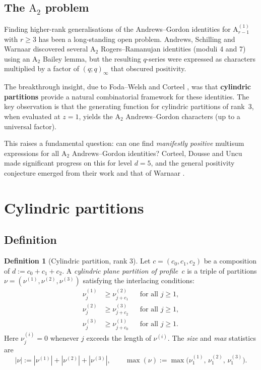 \documentclass[11pt]{article}
\theoremstyle{plain}
\theoremstyle{definition}
\newtheorem{definition}[theorem]{Definition}
\begin{document}
\subsection{The $\mathrm{A}_2$ problem}

Finding higher-rank generalisations of the Andrews--Gordon identities
for $\mathrm{A}_{r-1}^{(1)}$ with $r \geq 3$ has been a long-standing open problem.
Andrews, Schilling and Warnaar \cite{ASW} discovered several
$\mathrm{A}_2$ Rogers--Ramanujan identities (moduli 4 and 7) using an
$\mathrm{A}_2$ Bailey lemma, but the resulting $q$-series were expressed as
characters multiplied by a factor of $(q;q)_\infty$ that obscured positivity.

The breakthrough insight, due to Foda--Welsh \cite{FW} and
Corteel \cite{Corteel}, was that \textbf{cylindric partitions} provide
a natural combinatorial framework for these identities.  The key
observation is that the generating function for cylindric partitions of
rank~3, when evaluated at $z = 1$, yields the $\mathrm{A}_2$
Andrews--Gordon characters (up to a universal factor).

This raises a fundamental question: can one find \emph{manifestly positive}
multisum expressions for all $\mathrm{A}_2$ Andrews--Gordon identities?
Corteel, Dousse and Uncu \cite{CDU} made significant progress on this
for level $d = 5$, and the general positivity conjecture emerged from
their work and that of Warnaar \cite{W}.


\section{Cylindric partitions}
\label{sec:cpp}

\subsection{Definition}

\begin{definition}[Cylindric partition, rank 3]
\label{def:cpp}
Let $c = (c_0, c_1, c_2)$ be a composition of $d := c_0 + c_1 + c_2$.
A \emph{cylindric plane partition of profile~$c$} is a triple of partitions
$\nu = (\nu^{(1)}, \nu^{(2)}, \nu^{(3)})$ satisfying the interlacing conditions:
\begin{align}
  \nu^{(1)}_j &\geq \nu^{(2)}_{j+c_1} && \text{for all } j \geq 1, \label{eq:interlace1} \\
  \nu^{(2)}_j &\geq \nu^{(3)}_{j+c_2} && \text{for all } j \geq 1, \label{eq:interlace2} \\
  \nu^{(3)}_j &\geq \nu^{(1)}_{j+c_0} && \text{for all } j \geq 1. \label{eq:interlace3}
\end{align}
Here $\nu^{(i)}_j = 0$ whenever $j$ exceeds the length of $\nu^{(i)}$.
The \emph{size} and \emph{max} statistics are
\[
  |\nu| := |\nu^{(1)}| + |\nu^{(2)}| + |\nu^{(3)}|,
  \qquad
  \max(\nu) := \max\bigl(\nu^{(1)}_1,\, \nu^{(2)}_1,\, \nu^{(3)}_1\bigr).
\]
\end{definition}
\end{document}
